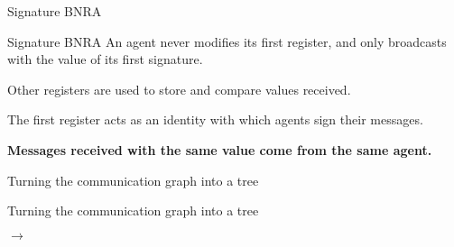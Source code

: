 \documentclass{beamer}
\begin{document}
\begin{frame}{Signature BNRA}
	\begin{block}{Signature BNRA}
		An agent never modifies its first register, and only broadcasts with the value of its first signature.
		
		Other registers are used to store and compare values received.
	\end{block}
	The first register acts as an identity with which agents sign their messages. 
	
	\vspace{-0.4cm}
	\begin{center}
	\end{center}
	
	\pause
	\textbf{\small Messages received with the same value come from the same agent.}
\end{frame}



\begin{frame}{Turning the communication graph into a tree}
\centering

\end{frame}

\begin{frame}{Turning the communication graph into a tree}
\begin{minipage}{0.55\linewidth}
\centering
\resizebox{6.5cm}{!}{

}
\end{minipage}
\begin{minipage}{0.1\linewidth}
$\longrightarrow$
\end{minipage}
\begin{minipage}{0.25 \linewidth}
\resizebox{!}{5cm}{

}
\end{minipage}
\hfill
\end{frame}
\end{document}
